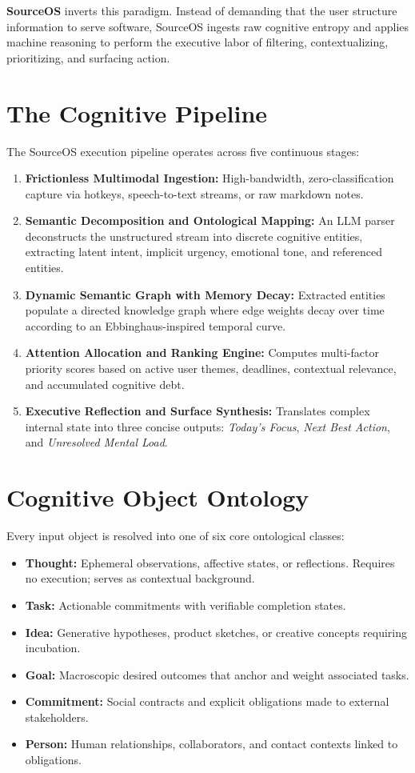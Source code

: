 \documentclass[11pt,a4paper]{article}
\begin{document}
\textbf{SourceOS} inverts this paradigm. Instead of demanding that the user structure information to serve software, SourceOS ingests raw cognitive entropy and applies machine reasoning to perform the executive labor of filtering, contextualizing, prioritizing, and surfacing action.

\section{The Cognitive Pipeline}
The SourceOS execution pipeline operates across five continuous stages:
\begin{enumerate}
    \item \textbf{Frictionless Multimodal Ingestion:} High-bandwidth, zero-classification capture via hotkeys, speech-to-text streams, or raw markdown notes.
    \item \textbf{Semantic Decomposition and Ontological Mapping:} An LLM parser deconstructs the unstructured stream into discrete cognitive entities, extracting latent intent, implicit urgency, emotional tone, and referenced entities.
    \item \textbf{Dynamic Semantic Graph with Memory Decay:} Extracted entities populate a directed knowledge graph where edge weights decay over time according to an Ebbinghaus-inspired temporal curve.
    \item \textbf{Attention Allocation and Ranking Engine:} Computes multi-factor priority scores based on active user themes, deadlines, contextual relevance, and accumulated cognitive debt.
    \item \textbf{Executive Reflection and Surface Synthesis:} Translates complex internal state into three concise outputs: \textit{Today's Focus}, \textit{Next Best Action}, and \textit{Unresolved Mental Load}.
\end{enumerate}

\section{Cognitive Object Ontology}
Every input object is resolved into one of six core ontological classes:
\begin{itemize}
    \item \textbf{Thought:} Ephemeral observations, affective states, or reflections. Requires no execution; serves as contextual background.
    \item \textbf{Task:} Actionable commitments with verifiable completion states.
    \item \textbf{Idea:} Generative hypotheses, product sketches, or creative concepts requiring incubation.
    \item \textbf{Goal:} Macroscopic desired outcomes that anchor and weight associated tasks.
    \item \textbf{Commitment:} Social contracts and explicit obligations made to external stakeholders.
    \item \textbf{Person:} Human relationships, collaborators, and contact contexts linked to obligations.
\end{itemize}
\end{document}
